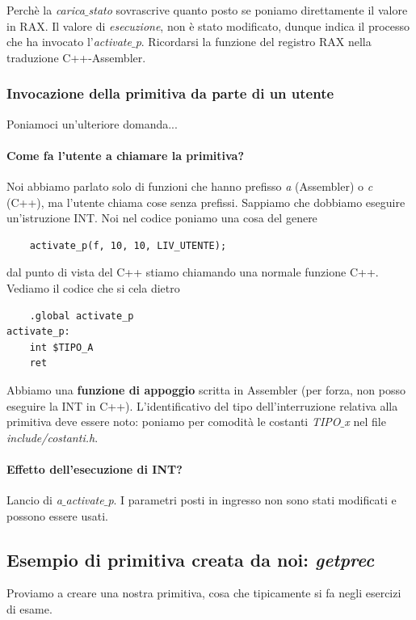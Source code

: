 \documentclass[11pt]{report}
\theoremstyle{definition}
\begin{document}
\begin{itemize}
\begin{framed}
	Perchè la \emph{carica$\_$stato} sovrascrive quanto posto se poniamo direttamente il valore in RAX. Il valore di \emph{esecuzione}, non è stato modificato, dunque indica il processo che ha invocato l'\emph{activate$\_$p}. Ricordarsi la funzione del registro RAX nella traduzione C++-Assembler.
	\end{framed}
\end{itemize}

\subsubsection{Invocazione della primitiva da parte di un utente}
Poniamoci un'ulteriore domanda...
\paragraph{Come fa l'utente a chiamare la primitiva?} Noi abbiamo parlato solo di funzioni che hanno prefisso \emph{a} (Assembler) o \emph{c} (C++), ma l'utente chiama cose senza prefissi. Sappiamo che dobbiamo eseguire un'istruzione INT. Noi nel codice poniamo una cosa del genere
\begin{verbatim}
	activate_p(f, 10, 10, LIV_UTENTE);
\end{verbatim}
dal punto di vista del C++ stiamo chiamando una normale funzione C++. Vediamo il codice che si cela dietro
\small 
\begin{verbatim}
    .global activate_p
activate_p:
    int $TIPO_A
    ret
\end{verbatim}
\normalsize 
Abbiamo una \textbf{funzione di appoggio} scritta in Assembler (per forza, non posso eseguire la INT in C++). L'identificativo del tipo dell'interruzione relativa alla primitiva deve essere noto: poniamo per comodità le costanti \emph{TIPO$\_$x} nel file \emph{include/costanti.h}.

\paragraph{Effetto dell'esecuzione di INT?} Lancio di \emph{a$\_$activate$\_$p}. I parametri posti in ingresso non sono stati modificati e possono essere usati.

\subsection{Esempio di primitiva creata da noi: \emph{getprec}}
Proviamo a creare una nostra primitiva, cosa che tipicamente si fa negli esercizi di esame.
\end{document}
